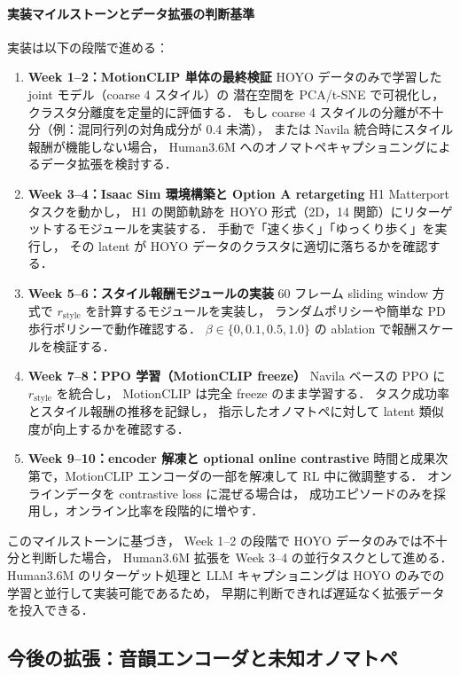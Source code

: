 \documentclass[a4paper,10pt]{jsarticle}
\begin{document}
\paragraph{実装マイルストーンとデータ拡張の判断基準}
実装は以下の段階で進める：
\begin{enumerate}
  \item \textbf{Week 1--2：MotionCLIP 単体の最終検証}
    HOYO データのみで学習した joint モデル（coarse 4 スタイル）の
    潜在空間を PCA/t-SNE で可視化し，
    クラスタ分離度を定量的に評価する．
    もし coarse 4 スタイルの分離が不十分（例：混同行列の対角成分が 0.4 未満），
    または Navila 統合時にスタイル報酬が機能しない場合，
    Human3.6M へのオノマトペキャプショニングによるデータ拡張を検討する．
  \item \textbf{Week 3--4：Isaac Sim 環境構築と Option A retargeting}
    H1 Matterport タスクを動かし，
    H1 の関節軌跡を HOYO 形式（2D，14 関節）にリターゲットするモジュールを実装する．
    手動で「速く歩く」「ゆっくり歩く」を実行し，
    その latent が HOYO データのクラスタに適切に落ちるかを確認する．
  \item \textbf{Week 5--6：スタイル報酬モジュールの実装}
    60 フレーム sliding window 方式で $r_{\mathrm{style}}$ を計算するモジュールを実装し，
    ランダムポリシーや簡単な PD 歩行ポリシーで動作確認する．
    $\beta \in \{0, 0.1, 0.5, 1.0\}$ の ablation で報酬スケールを検証する．
  \item \textbf{Week 7--8：PPO 学習（MotionCLIP freeze）}
    Navila ベースの PPO に $r_{\mathrm{style}}$ を統合し，
    MotionCLIP は完全 freeze のまま学習する．
    タスク成功率とスタイル報酬の推移を記録し，
    指示したオノマトペに対して latent 類似度が向上するかを確認する．
  \item \textbf{Week 9--10：encoder 解凍と optional online contrastive}
    時間と成果次第で，MotionCLIP エンコーダの一部を解凍して
    RL 中に微調整する．
    オンラインデータを contrastive loss に混ぜる場合は，
    成功エピソードのみを採用し，オンライン比率を段階的に増やす．
\end{enumerate}

このマイルストーンに基づき，
Week 1--2 の段階で HOYO データのみでは不十分と判断した場合，
Human3.6M 拡張を Week 3--4 の並行タスクとして進める．
Human3.6M のリターゲット処理と LLM キャプショニングは
HOYO のみでの学習と並行して実装可能であるため，
早期に判断できれば遅延なく拡張データを投入できる．

\subsection{今後の拡張：音韻エンコーダと未知オノマトペ}
\end{document}

